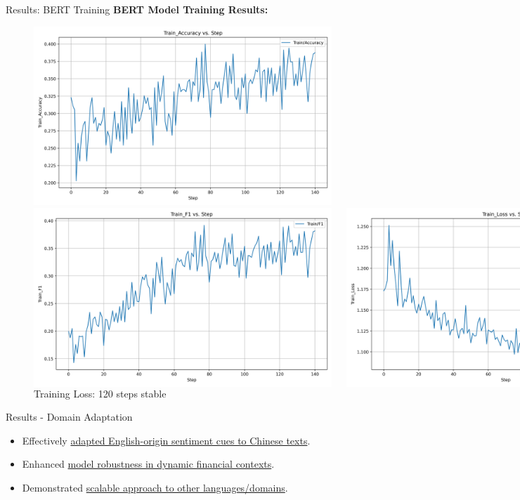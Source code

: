 \documentclass[aspectratio=169]{beamer}
\begin{document}
\begin{frame}{Results: BERT Training}
  \textbf{BERT Model Training Results:}
  \begin{figure}
    \centering
    \includegraphics[width=0.25\linewidth]{BERT_Train_Accuracy.png}
    \caption{\small Training Accuracy: Increasing}
    \vspace{1em}

    \begin{columns}[c]
      \centering
      \includegraphics[width=0.55\linewidth]{BERT_Train_F1.png}
      \caption{\small Training F1 Score: 60 steps stable}

      \centering
      \includegraphics[width=0.55\linewidth]{BERT_Train_Loss.png}
      \caption{\small Training Loss: 120 steps stable}
    \end{columns}
  \end{figure}
\end{frame}

\begin{frame}{Results - Domain Adaptation}
  \begin{itemize}
    \item Effectively \underline{adapted English-origin sentiment cues to Chinese texts}.
    \item Enhanced \underline{model robustness in dynamic financial contexts}.
    \item Demonstrated \underline{scalable approach to other languages/domains}.
  \end{itemize}
\end{frame}
\end{document}
